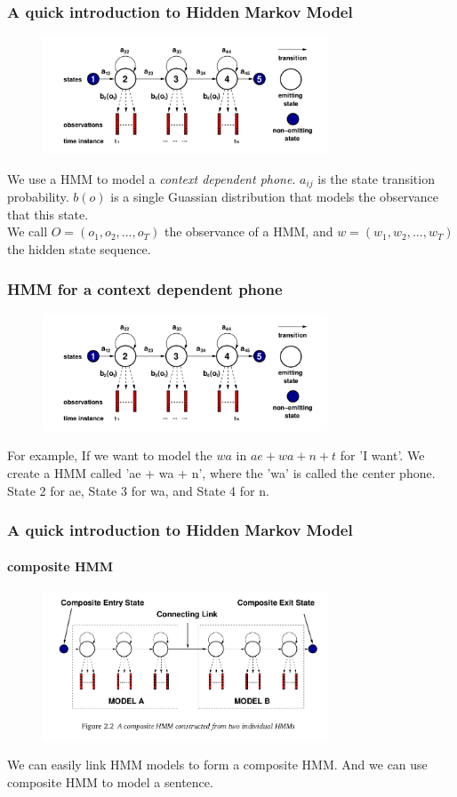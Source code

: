\documentclass{beamer}
\begin{document}
\begin{frame}
\frametitle{A quick introduction to Hidden Markov Model}
\begin{figure}
\includegraphics[width=240pt]{HMM.png}
\end{figure}
We use a HMM to model a \emph{context dependent phone}. $a_{ij}$ is the state transition probability. $b(o)$ is a single Guassian distribution that models the observance that this state.\\
We call $O=(o_1,o_2,...,o_T)$ the observance of a HMM, and $w = (w_1,w_2,...,w_T)$ the hidden state sequence.
\end{frame}

\begin{frame}
\frametitle{HMM for a context dependent phone}
\begin{figure}
\includegraphics[width=240pt]{HMM.png}
\end{figure}
For example, If we want to model the $wa$ in $ae + wa + n + t$ for 'I want'. We create a HMM called 'ae + wa + n', where the 'wa' is called the center phone. State 2 for ae, State 3 for wa, and State 4 for n.
\end{frame}


\begin{frame}
\frametitle{A quick introduction to Hidden Markov Model}
\framesubtitle{composite HMM}
\begin{figure}
\includegraphics[width=240pt]{composite-HMM.png}
\end{figure}
We can easily link HMM models to form a composite HMM. And we can use composite HMM to model a sentence.\\
\end{frame}
\end{document}
